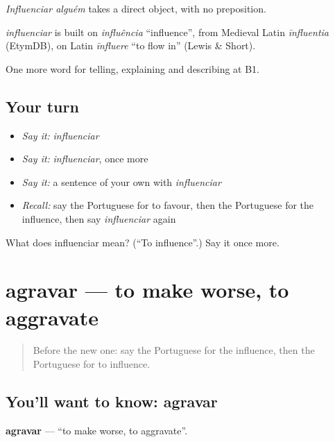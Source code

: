 \emph{Influenciar alguém} takes a direct object, with no preposition.

\begin{cousinweb}
\emph{influenciar} is built on \emph{influência} \textquotedblleft{}influence\textquotedblright{}, from Medieval Latin \emph{īnfluentia} (EtymDB), on Latin \emph{īnfluere} \textquotedblleft{}to flow in\textquotedblright{} (Lewis \& Short).
\end{cousinweb}

\begin{grammarlens}[title={What you've built}]
One more word for telling, explaining and describing at B1.
\end{grammarlens}

\subsection*{Your turn}
\begin{itemize}
\raggedright
  \item \emph{Say it:} \emph{influenciar}
  \item \emph{Say it:} \emph{influenciar}, once more
  \item \emph{Say it:} a sentence of your own with \emph{influenciar}
  \item \emph{Recall:} say the Portuguese for to favour, then the Portuguese for the influence, then say \emph{influenciar} again
\end{itemize}

\begin{tcolorbox}[breakable,colback=teal!4,colframe=teal!35!black,title={Before you move on}]
What does influenciar mean? (\textquotedblleft{}To influence\textquotedblright{}.) Say it once more.
\end{tcolorbox}
\section[agravar]{agravar — to make worse, to aggravate}

\label{lesson:PT-C354-agravar}



\begin{quote}
Before the new one: say the Portuguese for the influence, then the Portuguese for to influence.
\end{quote}

\subsection*{You'll want to know: agravar}
\textbf{agravar} — \textquotedblleft{}to make worse, to aggravate\textquotedblright{}.

